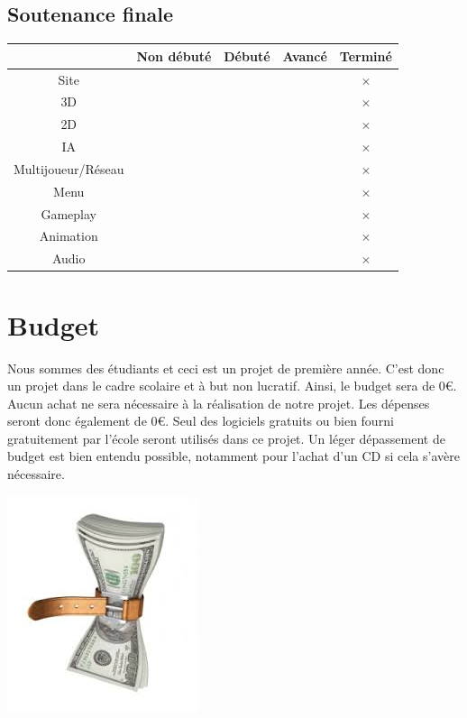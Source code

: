 \documentclass[a4paper, 12pt]{article}
\begin{document}
	\subsection{Soutenance finale}
	\begin{tabular}{|c||c|c|c|c|}
		\hline
		& Non débuté & Débuté & Avancé & Terminé \\
		\hline
		Site & & & & $\times$ \\
		\hline
		3D & & & & $\times$ \\
		\hline
		2D & & & & $\times$ \\
		\hline
		IA & & & & $\times$ \\
		\hline
		Multijoueur/Réseau & & & & $\times$ \\
		\hline
		Menu & & & & $\times$ \\
		\hline
		Gameplay & & & & $\times$\\
		\hline
		Animation & & & & $\times$\\		
		\hline
		Audio & & & & $\times$ \\
		\hline		
	\end{tabular}
\section{Budget}

Nous sommes des étudiants et ceci est un projet de première année. C'est donc un projet dans le cadre scolaire et à but non lucratif. Ainsi, le budget sera de 0\euro{}. Aucun achat ne sera nécessaire à la réalisation de notre projet. Les dépenses seront donc également de 0\euro{}. Seul des logiciels gratuits ou bien fourni gratuitement par l'école seront utilisés dans ce projet. Un léger dépassement de budget est bien entendu possible, notamment pour l'achat d'un CD si cela s'avère nécessaire.\\
\centerline{\includegraphics[scale=0.7]{images.jpg}}
\end{document}
